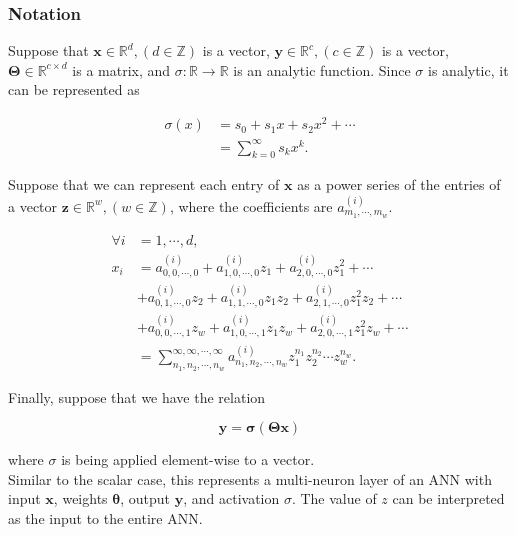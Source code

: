 \subsubsection{Notation}

Suppose that $\mathbf{x} \in \mathbb{R}^d, (d \in \mathbb{Z})$ is a vector, $\mathbf{y} \in \mathbb{R}^c, (c \in \mathbb{Z})$ is a vector, $\mathbf{\Theta} \in \mathbb{R}^{c \times d}$ is a matrix, and $\sigma: \mathbb{R} \to \mathbb{R}$ is an analytic function. Since $\sigma$ is analytic, it can be represented as

\begin{align}
    \sigma(x)
    &= s_0 + s_1 x + s_2 x^2 + \cdots \nonumber \\
    &= \sum_{k=0}^{\infty} s_{k} x^{k}.
    \label{eqn:vector layer activation}
\end{align}

Suppose that we can represent each entry of $\mathbf{x}$ as a power series of the entries of a vector $\mathbf{z} \in \mathbb{R}^{w}, (w \in \mathbb{Z})$, where the coefficients are $a^{(i)}_{m_1, \cdots, m_w}$.

\begin{align}
    \forall i &= 1, \cdots, d, \nonumber \\ x_i
    &= a^{(i)}_{0,0,\cdots,0} + a^{(i)}_{1,0,\cdots,0} z_1 + a^{(i)}_{2,0,\cdots,0} z_1^2 + \cdots \nonumber \\
    &+ a^{(i)}_{0,1,\cdots,0} z_2 + a^{(i)}_{1,1,\cdots,0} z_1 z_2 + a^{(i)}_{2,1,\cdots,0} z_1^2 z_2 + \cdots \nonumber \\
    &+ a^{(i)}_{0,0,\cdots,1} z_w + a^{(i)}_{1,0,\cdots,1} z_1 z_w + a^{(i)}_{2,0,\cdots,1} z_1^2 z_w + \cdots \nonumber \\
    &= \sum_{n_1,n_2,\cdots,n_w}^{\infty,\infty,\cdots,\infty} a^{(i)}_{n_1,n_2,\cdots,n_w} z_1^{n_1} z_2^{n_2} \cdots z_w^{n_w}.
    \label{eqn:vector x series}
\end{align}

Finally, suppose that we have the relation

\begin{equation}
    \mathbf{y} = \mathbf{\sigma}(\mathbf{\Theta} \mathbf{x})
    \label{eqn:vector layer relation}
\end{equation}

where $\sigma$ is being applied element-wise to a vector.\\

Similar to the scalar case, this represents a multi-neuron layer of an ANN with input $\mathbf{x}$, weights $\mathbf{\theta}$, output $\mathbf{y}$, and activation $\sigma$. The value of $z$ can be interpreted as the input to the entire ANN.


